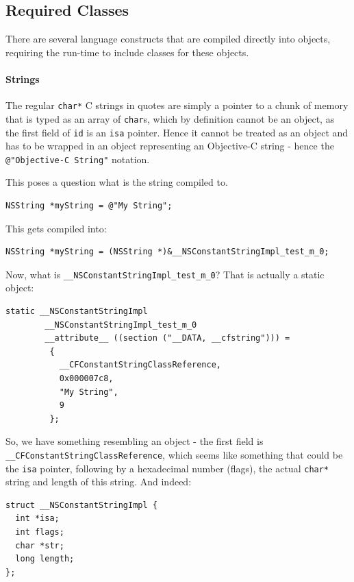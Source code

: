\subsection{Required Classes}

There are several language constructs that are compiled directly into objects, requiring the run-time to include classes for these objects.

\paragraph{Strings} The regular \verb=char*= C strings in quotes are simply a pointer to a chunk of memory that is typed as an array of \verb=char=s, which by definition cannot be an object, as the first field of \verb=id= is an \verb=isa= pointer. Hence it cannot be treated as an object and has to be wrapped in an object representing an Objective-C string - hence the \verb=@"Objective-C String"= notation.

This poses a question what is the string compiled to.

\begin{verbatim}
NSString *myString = @"My String";
\end{verbatim}

This gets compiled into:

\begin{verbatim}
NSString *myString = (NSString *)&__NSConstantStringImpl_test_m_0;
\end{verbatim}

Now, what is \verb=__NSConstantStringImpl_test_m_0=? That is actually a static object:

\begin{verbatim}
static __NSConstantStringImpl 
        __NSConstantStringImpl_test_m_0 
        __attribute__ ((section ("__DATA, __cfstring"))) = 
         {
           __CFConstantStringClassReference,
           0x000007c8,
           "My String",
           9
         };
\end{verbatim}

So, we have something resembling an object - the first field is \newline{}\verb=__CFConstantStringClassReference=, which seems like something that could be the \verb=isa= pointer, following by a hexadecimal number (flags), the actual \verb=char*= string and length of this string. And indeed:

\begin{verbatim}
struct __NSConstantStringImpl {
  int *isa;
  int flags;
  char *str;
  long length;
};
\end{verbatim}

